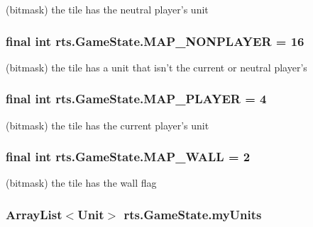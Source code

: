 \label{classrts_1_1_game_state_a91ca0cc55905241db9813413990ce41b}
(bitmask) the tile has the neutral player's unit \hypertarget{classrts_1_1_game_state_ad8c202b6a846602677feafec3a508a37}{
\subsubsection[{MAP\_\-NONPLAYER}]{\setlength{\rightskip}{0pt plus 5cm}final int {\bf rts.GameState.MAP\_\-NONPLAYER} = 16}}
\label{classrts_1_1_game_state_ad8c202b6a846602677feafec3a508a37}
(bitmask) the tile has a unit that isn't the current or neutral player's \hypertarget{classrts_1_1_game_state_a409da5852f5fbcb2bd2bdce1bfed6ecd}{
\subsubsection[{MAP\_\-PLAYER}]{\setlength{\rightskip}{0pt plus 5cm}final int {\bf rts.GameState.MAP\_\-PLAYER} = 4}}
\label{classrts_1_1_game_state_a409da5852f5fbcb2bd2bdce1bfed6ecd}
(bitmask) the tile has the current player's unit \hypertarget{classrts_1_1_game_state_a439d94001bcac138eb445a25b389f3ed}{
\subsubsection[{MAP\_\-WALL}]{\setlength{\rightskip}{0pt plus 5cm}final int {\bf rts.GameState.MAP\_\-WALL} = 2}}
\label{classrts_1_1_game_state_a439d94001bcac138eb445a25b389f3ed}
(bitmask) the tile has the wall flag \hypertarget{classrts_1_1_game_state_a37347cda7fc0b8cd1d2c2738b45bb068}{
\subsubsection[{myUnits}]{\setlength{\rightskip}{0pt plus 5cm}ArrayList$<${\bf Unit}$>$ {\bf rts.GameState.myUnits}}}
